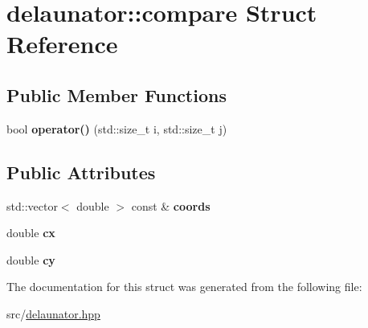 \hypertarget{structdelaunator_1_1compare}{}\section{delaunator\+:\+:compare Struct Reference}
\label{structdelaunator_1_1compare}
\subsection*{Public Member Functions}
\begin{DoxyCompactItemize}
\item 
\mbox{\label{structdelaunator_1_1compare_a78b94657ec7bad085353f318365fa20a}} 
bool {\bfseries operator()} (std\+::size\+\_\+t i, std\+::size\+\_\+t j)
\end{DoxyCompactItemize}
\subsection*{Public Attributes}
\begin{DoxyCompactItemize}
\item 
\mbox{\label{structdelaunator_1_1compare_a28fe3e7cd51ef236ac051fb47421321a}} 
std\+::vector$<$ double $>$ const  \& {\bfseries coords}
\item 
\mbox{\label{structdelaunator_1_1compare_a71238f2868c76ee8048cdd72d58da65c}} 
double {\bfseries cx}
\item 
\mbox{\label{structdelaunator_1_1compare_ad8f7ce42823fff74a6062e439f93682d}} 
double {\bfseries cy}
\end{DoxyCompactItemize}


The documentation for this struct was generated from the following file\+:\begin{DoxyCompactItemize}
\item 
src/\hyperlink{delaunator_8hpp}{delaunator.\+hpp}\end{DoxyCompactItemize}
